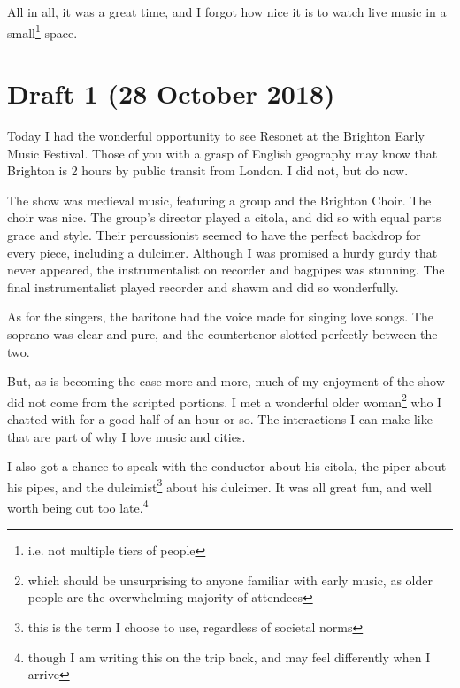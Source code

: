 \documentclass[12pt]{article}[titlepage]
\newcommand{\1}{\={a}}
\newcommand{\2}{\={e}}
\newcommand{\3}{\={\i}}
\newcommand{\4}{\=o}
\newcommand{\5}{\=u}
\newcommand{\6}{\={A}}
\renewcommand{\,}{\textsuperscript{,}}
\begin{document}
All in all, it was a great time, and I forgot how nice it is to watch live music in a small\footnote{i.e. not multiple tiers of people} space.

\section{Draft 1 (28 October 2018)}
Today I had the wonderful opportunity to see Resonet at the Brighton Early Music Festival.
Those of you with a grasp of English geography may know that Brighton is 2 hours by public transit from London.
I did not, but do now.

The show was medieval music, featuring a group and the Brighton Choir.
The choir was nice.
The group's director played a citola, and did so with equal parts grace and style.
Their percussionist seemed to have the perfect backdrop for every piece, including a dulcimer.
Although I was promised a hurdy gurdy that never appeared, the instrumentalist on recorder and bagpipes was stunning.
The final instrumentalist played recorder and shawm and did so wonderfully.

As for the singers, the baritone had the voice made for singing love songs.
The soprano was clear and pure, and the countertenor slotted perfectly between the two.

But, as is becoming the case more and more, much of my enjoyment of the show did not come from the scripted portions.
I met a wonderful older woman\footnote{which should be unsurprising to anyone familiar with early music, as older people are the overwhelming majority of attendees} who I chatted with for a good half of an hour or so.
The interactions I can make like that are part of why I love music and cities.

I also got a chance to speak with the conductor about his citola, the piper about his pipes, and the dulcimist\footnote{this is the term I choose to use, regardless of societal norms} about his dulcimer.
It was all great fun, and well worth being out too late.\footnote{though I am writing this on the trip back, and may feel differently when I arrive}
\end{document}
